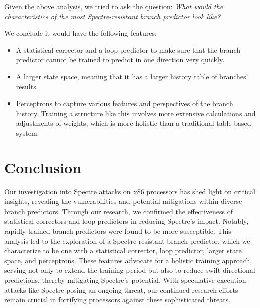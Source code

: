 \documentclass[twocolumn,showpacs,%
  nofootinbib,aps,superscriptaddress,%
  eqsecnum,prd,notitlepage,showkeys,10pt]{revtex4-1}
\begin{document}
Given the above analysis, we tried to ask the question: \textit{What would the characteristics of the most Spectre-resistant branch predictor look like?}

We conclude it would have the following features:
\begin{itemize}
    \item A statistical corrector and a loop predictor to make sure that the branch predictor cannot be trained to predict in one direction very quickly.
    \item A larger state space, meaning that it has a larger history table of branches' results.
    \item Perceptrons to capture various features and perspectives of the branch history. Training a structure like this involves more extensive calculations and adjustments of weights, which is more holistic than a traditional table-based system.
\end{itemize}

\section{Conclusion}
Our investigation into Spectre attacks on x86 processors has shed light on critical insights, revealing the vulnerabilities and potential mitigations within diverse branch predictors. Through our research, we confirmed the effectiveness of statistical correctors and loop predictors in reducing Spectre's impact. Notably, rapidly trained branch predictors were found to be more susceptible. This analysis led to the exploration of a Spectre-resistant branch predictor, which we characterize to be one with a statistical corrector, loop predictor, larger state space, and perceptrons. These features advocate for a holistic training approach, serving not only to extend the training period but also to reduce swift directional predictions, thereby mitigating Spectre's potential. With speculative execution attacks like Spectre posing an ongoing threat, our continued research efforts remain crucial in fortifying processors against these sophisticated threats.




\end{document}
